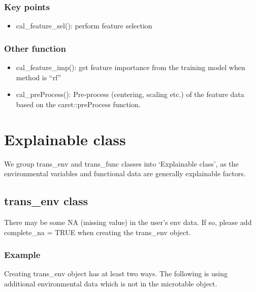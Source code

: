 \documentclass[
]{book}
\providecommand{\tightlist}{%
  \setlength{\itemsep}{0pt}\setlength{\parskip}{0pt}}
\begin{document}
\hypertarget{key-points-8}{%
\subsection{Key points}\label{key-points-8}}

\begin{itemize}
\tightlist
\item
  cal\_feature\_sel(): perform feature selection
\end{itemize}

\hypertarget{other-function-1}{%
\subsection{Other function}\label{other-function-1}}

\begin{itemize}
\tightlist
\item
  cal\_feature\_imp(): get feature importance from the training model when method is ``rf''
\item
  cal\_preProcess(): Pre-process (centering, scaling etc.) of the feature data based on the caret::preProcess function.
\end{itemize}

\hypertarget{explainable-class}{%
\chapter{Explainable class}\label{explainable-class}}

We group trans\_env and trans\_func classes into `Explainable class',
as the environmental variables and functional data are generally explainable factors.

\hypertarget{trans_env-class}{%
\section{trans\_env class}\label{trans_env-class}}

There may be some NA (missing value) in the user's env data.
If so, please add complete\_na = TRUE when creating the trans\_env object.

\hypertarget{example-7}{%
\subsection{Example}\label{example-7}}

Creating trans\_env object has at least two ways.
The following is using additional environmental data which is not in the microtable object.
\end{document}
